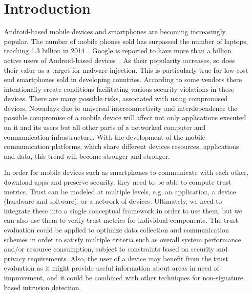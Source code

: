 \section{Introduction}

Android-based mobile devices and smartphones are becoming increasingly popular.  The number of mobile phones
sold has surpassed the number of laptops, reaching 1.3 billion in 
2014~\cite{market}.  Google is 
reported to have more than a billion active users of 
Android-based devices~\cite{android-users}.  
As their popularity increases, so does their value as
a target for malware injection.  
This is particularly true for low cost end smartphones sold in developing countries. According to \cite{zheng2014droidray}
some vendors there intentionally create conditions facilitating various security violations in these devices.
 There are many possible risks, associated with using compromised devices.  Nowadays due to universal interconnectivity and 
interdependence the 
possible compromise of a mobile device will affect not only applications executed on it and its users but all other parts 
of a networked computer and communication infrastructure.
With the development of the mobile communication platforms, which share different devices resources, applications and data, 
this trend will become stronger and stronger. 

In order for mobile devices such as smartphones to communicate with each other, download apps and preserve security, they need to
be able to compute trust metrics.   Trust can be modeled at 
multiple levels, e.g. an application, a device (hardware and software), or a network of devices.  Ultimately, we need to 
integrate these into a single conceptual framework in order to use them, but we can also use them to verify trust metrics
for individual components.
The trust evaluation  could 
be applied to optimize data collection and communication schemes in order to satisfy multiple criteria such as overall 
system performance and/or resource consumption, subject to constraints based on security and privacy requirements.
Also, the user of a device may benefit from the trust evaluation as it might 
provide useful information about areas in need of improvement, and it could be combined with other techniques for
 non-signature based intrusion detection.

